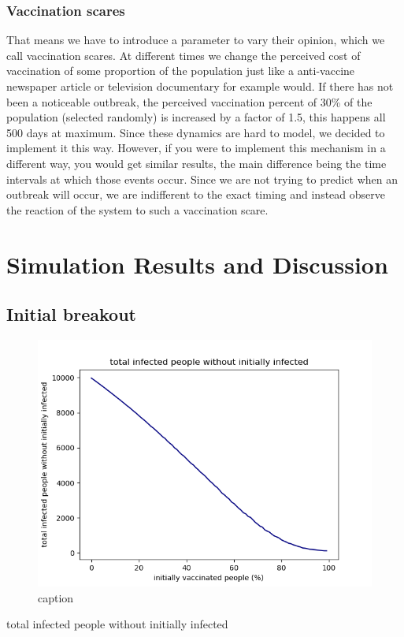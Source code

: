 \documentclass[11pt]{article}
\begin{document}
\subsubsection{Vaccination scares}
That means we have to introduce a parameter to vary their opinion, which we call vaccination scares. At different times we change the perceived cost of vaccination of some proportion of the population just like a anti-vaccine newspaper article or television documentary for example would.
If there has not been a noticeable outbreak, the perceived vaccination percent of 30\% of the population (selected randomly) is increased by a factor of 1.5, this happens all 500 days at maximum. Since these dynamics are hard to model, we decided to implement it this way. However, if you were to implement this mechanism in a different way, you would get similar results, the main difference being the time intervals at which those events occur. Since we are not trying to predict when an outbreak will occur, we are indifferent to the exact timing and instead observe the reaction of the system to such a vaccination scare. 




\section{Simulation Results and Discussion}


\subsection{Initial breakout}

\begin{figure}
\begin{center}
\includegraphics[scale=0.5]{totalinfecwoinitinfec}
\end{center}
\caption{caption}
\label{fig:test5}
\end{figure}
total infected people without initially infected
\end{document}
